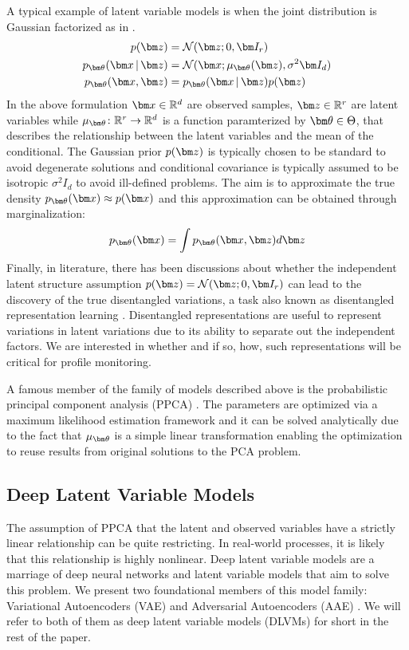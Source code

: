 \documentclass[journal, peerreview]{IEEEtran}
\begin{document}
A typical example of latent variable models is when the joint distribution is Gaussian factorized as in .
\begin{equation}
\label{eq:gaussian-factorized}
\begin{split}
\pz &= \Norm(\mbz;0,\mbI_{r})\\
\decoding &= \Norm(\mbx; \mu_{\mbtheta}(\mbz),\sigma^2 \mbI_{d}) \\
p_{\mbtheta}(\mbx,\mbz) &= \decoding\pz
\end{split}
\end{equation}
In the above formulation $\mbx \in \R^{d}$ are observed samples, $\mbz \in \R^{r}$ are latent variables while $\mu_{\mbtheta}\colon\R^{r}\to\R^{d} $ is a function paramterized by $\mbtheta \in \Theta$, that describes the relationship between the latent variables and the mean of the conditional. The Gaussian prior $\pz$ is typically chosen to be standard to avoid degenerate solutions \cite[p. 307]{roweis1999unifying} and conditional covariance is typically assumed to be isotropic $\sigma^2 I_{d}$ to avoid ill-defined problems.
The aim is to approximate the true density $p_{\mbtheta}(\mbx) \approx p(\mbx)$ and this approximation can be obtained through marginalization:
$$
p_{\mbtheta}(\mbx) = \int p_{\mbtheta}(\mbx,\mbz) d\mbz
$$
Finally, in literature, there has been discussions about  whether the independent latent structure assumption $\pz = \Norm(\mbz;0,\mbI_{r})$ can lead to the discovery of the true disentangled variations, a task also known as disentangled representation learning \cite[Sec. 3.5]{bengio2013representation}. Disentangled representations are useful to represent variations in latent variations due to its ability to separate out the independent factors. We are interested in whether and if so, how, such representations will be critical for profile monitoring. 

A famous member of the family of models described above is the probabilistic principal component analysis (PPCA) \cite{tipping1999probabilistic}.
The parameters are optimized via a maximum likelihood estimation framework and it can be solved analytically due to the fact that $\mu_{\mbtheta}$ is a simple linear transformation enabling the optimization to reuse results from original solutions to the PCA problem.

\subsection{Deep Latent Variable Models}
The assumption of PPCA that the latent and observed variables have a strictly linear relationship can be quite restricting.
In real-world processes, it is likely that this relationship is highly nonlinear.
Deep latent variable models are a marriage of deep neural networks and latent variable models that aim to solve this problem.
We present two foundational members of this model family: Variational Autoencoders (VAE) \cite{Kingma2013-dl} and Adversarial Autoencoders (AAE) \cite{Makhzani2015-ei}.
We will refer to both of them as deep latent variable models (DLVMs) for short in the rest of the paper.
\end{document}
